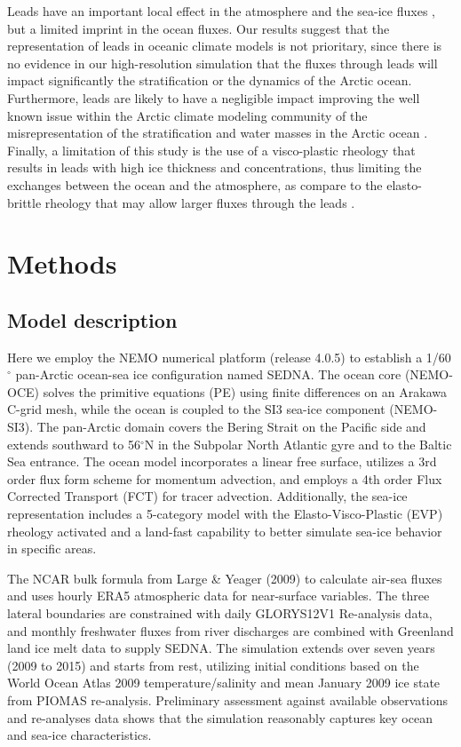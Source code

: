 \documentclass[lineno,sn-basic]{sn-jnl}%
\begin{document}
Leads have an important local effect in the atmosphere and the sea-ice fluxes \citep{Lupkes_leads_2008,Marcq_flux_lead_2012, Wettlaufer_insulator_1997, Smith_polynyas_1990}, but a limited imprint in the ocean fluxes. Our results suggest that the representation of leads in oceanic climate models is not prioritary, since there is no evidence in our high-resolution simulation that the fluxes through leads will impact significantly the stratification or the dynamics of the Arctic ocean.
Furthermore, leads are likely to have a negligible impact improving the well known issue within the Arctic climate modeling community of the misrepresentation of the stratification and water masses in the Arctic ocean \citep{Wang_ompi_2024,Ilicak_core_2016}. Finally, a limitation of this study is the use of a visco-plastic rheology that results in leads with high ice thickness and concentrations, thus limiting the exchanges between the ocean and the atmosphere, as compare to the elasto-brittle rheology that may allow larger fluxes through the leads \citep{Rampal_nextsim_2016,Olason_lead_2021}. 


\section{Methods}
\subsection*{Model description}

Here we employ the NEMO numerical platform (release 4.0.5) to establish a 1/60$^\circ$ pan-Arctic ocean-sea ice configuration named SEDNA. The ocean core (NEMO-OCE) solves the primitive equations (PE) using finite differences on an Arakawa C-grid mesh, while the ocean is coupled to the SI3 sea-ice component (NEMO-SI3). The pan-Arctic domain covers the Bering Strait on the Pacific side and extends southward to 56$^\circ$N in the Subpolar North Atlantic gyre and to the Baltic Sea entrance. The ocean model incorporates a linear free surface, utilizes a 3rd order flux form scheme for momentum advection, and employs a 4th order Flux Corrected Transport (FCT) for tracer advection. Additionally, the sea-ice representation includes a 5-category model with the Elasto-Visco-Plastic (EVP) rheology activated and a land-fast capability to better simulate sea-ice behavior in specific areas.

The NCAR bulk formula from Large \& Yeager (2009) to calculate air-sea fluxes and uses hourly ERA5 atmospheric data for near-surface variables. The three lateral boundaries are constrained with daily GLORYS12V1 Re-analysis data, and monthly freshwater fluxes from river discharges are combined with Greenland land ice melt data to supply SEDNA. The simulation extends over seven years (2009 to 2015) and starts from rest, utilizing initial conditions based on the World Ocean Atlas 2009 temperature/salinity and mean January 2009 ice state from PIOMAS re-analysis. Preliminary assessment against available observations and re-analyses data shows that the simulation reasonably captures key ocean and sea-ice characteristics.
\end{document}
